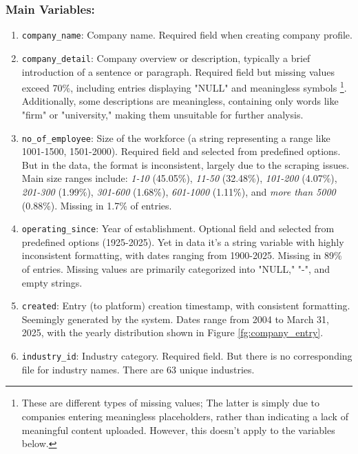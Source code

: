 \documentclass[12pt]{article}
\begin{document}
\subsubsection*{\textbf{Main Variables}:}
\begin{enumerate}
    \item \texttt{company\_name}: Company name. Required field when creating company profile.

    
    \item \texttt{company\_detail}: Company overview or description, typically a brief introduction of a sentence or paragraph. Required field but missing values exceed 70\%, including entries displaying "NULL" and meaningless symbols \footnote{These are different types of missing values; The latter is simply due to companies entering meaningless placeholders, rather than indicating a lack of meaningful content uploaded. However, this doesn't apply to the variables below.}. Additionally, some descriptions are meaningless, containing only words like "firm" or "university," making them unsuitable for further analysis.

    
    \item \texttt{no\_of\_employee}: Size of the workforce (a string representing a range like 1001-1500, 1501-2000). Required field and selected from predefined options. But in the data, the format is inconsistent, largely due to the scraping issues. Main size ranges include: \textit{1-10} (45.05\%), \textit{11-50} (32.48\%), \textit{101-200 }(4.07\%), \textit{201-300 }(1.99\%), \textit{301-600} (1.68\%), \textit{601-1000 }(1.11\%), and \textit{more than 5000} (0.88\%). Missing in 1.7\% of entries. 

    
    \item \texttt{operating\_since}: Year of establishment. Optional field and selected from predefined options (1925-2025). Yet in data it's a string variable with highly inconsistent formatting,  with dates ranging from 1900-2025. Missing in 89\% of entries. Missing values are primarily categorized into "NULL," "-", and empty strings.



    
    \item \texttt{created}: Entry (to platform) creation timestamp, with consistent formatting. Seemingly generated by the system. Dates range from 2004 to March 31, 2025, with the yearly distribution shown in Figure \ref{fg:company_entry}.



    
    \item \texttt{industry\_id}: Industry category. Required field. But there is no corresponding file for industry names. There are 63 unique industries.


\end{enumerate}
\end{document}
